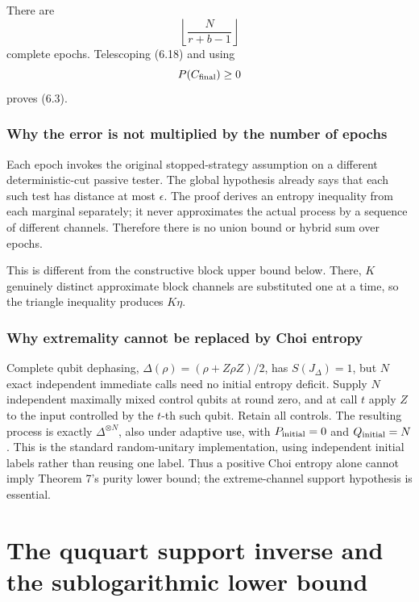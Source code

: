 \documentclass[11pt,a4paper]{article}
\numberwithin{equation}{section}
\begin{document}
There are \[
\left\lfloor
\frac{N}{r+b-1}
\right\rfloor
\] complete epochs. Telescoping (6.18) and using \[
P(C_{\rm final})\ge0
\] proves (6.3).

\subsubsection{Why the error is not multiplied by the number of
epochs}\label{why-the-error-is-not-multiplied-by-the-number-of-epochs}

Each epoch invokes the original stopped-strategy assumption on a
different deterministic-cut passive tester. The global hypothesis
already says that each such test has distance at most \(\epsilon\). The
proof derives an entropy inequality from each marginal separately; it
never approximates the actual process by a sequence of different
channels. Therefore there is no union bound or hybrid sum over epochs.

This is different from the constructive block upper bound below. There,
\(K\) genuinely distinct approximate block channels are substituted one
at a time, so the triangle inequality produces \(K\eta\).

\subsubsection{Why extremality cannot be replaced by Choi
entropy}\label{why-extremality-cannot-be-replaced-by-choi-entropy}

Complete qubit dephasing, \(\Delta(\rho)=(\rho+Z\rho Z)/2\), has
\(S(J_\Delta)=1\), but \(N\) exact independent immediate calls need no
initial entropy deficit. Supply \(N\) independent maximally mixed
control qubits at round zero, and at call \(t\) apply \(Z\) to the input
controlled by the \(t\)-th such qubit. Retain all controls. The
resulting process is exactly \(\Delta^{\otimes N}\), also under adaptive
use, with \(P_{\rm initial}=0\) and \(Q_{\rm initial}=N\). This is the
standard random-unitary implementation, using independent initial labels
rather than reusing one label. Thus a positive Choi entropy alone cannot
imply Theorem 7's purity lower bound; the extreme-channel support
hypothesis is essential.

\section{The ququart support inverse and the sublogarithmic lower
bound}\label{the-ququart-support-inverse-and-the-sublogarithmic-lower-bound}
\end{document}
